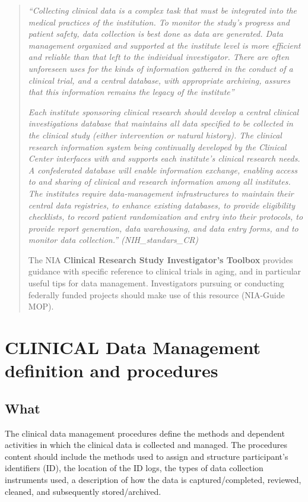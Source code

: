 \documentclass[]{book}
\begin{document}
\begin{quote}
\emph{``Collecting clinical data is a complex task that must be
integrated into the medical practices of the institution. To monitor the
study's progress and patient safety, data collection is best done as
data are generated. Data management organized and supported at the
institute level is more efficient and reliable than that left to the
individual investigator. There are often unforeseen uses for the kinds
of information gathered in the conduct of a clinical trial, and a
central database, with appropriate archiving, assures that this
information remains the legacy of the institute'' }

\emph{Each institute sponsoring clinical research should develop a
central clinical investigations database that maintains all data
specified to be collected in the clinical study (either intervention or
natural history). The clinical research information system being
continually developed by the Clinical Center interfaces with and
supports each institute's clinical research needs. A confederated
database will enable information exchange, enabling access to and
sharing of clinical and research information among all institutes. The
institutes require data-management infrastructures to maintain their
central data registries, to enhance existing databases, to provide
eligibility checklists, to record patient randomization and entry into
their protocols, to provide report generation, data warehousing, and
data entry forms, and to monitor data collection.'' (NIH\_standars\_CR)}

The NIA \textbf{Clinical Research Study Investigator's Toolbox} provides
guidance with specific reference to clinical trials in aging, and in
particular useful tips for data management. Investigators pursuing or
conducting federally funded projects should make use of this resource
(NIA-Guide MOP).
\end{quote}

\section{CLINICAL Data Management definition and
procedures}\label{clinical-data-management-definition-and-procedures}

\subsection{What}\label{what-18}

The clinical data management procedures define the methods and dependent
activities in which the clinical data is collected and managed. The
procedures content should include the methods used to assign and
structure participant's identifiers (ID), the location of the ID logs,
the types of data collection instruments used, a description of how the
data is captured/completed, reviewed, cleaned, and subsequently
stored/archived.
\end{document}
